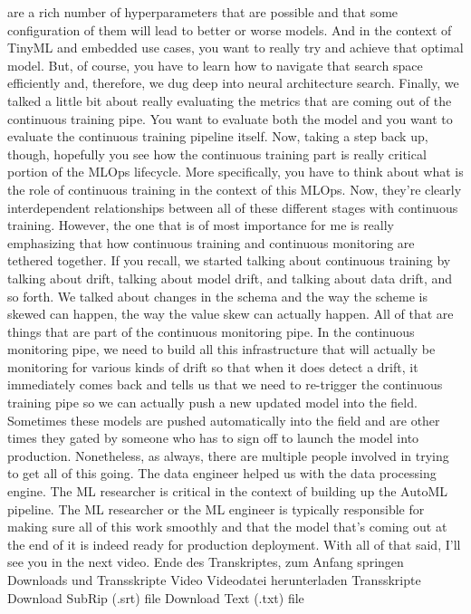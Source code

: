 {{{{    are a rich number of hyperparameters that are possible
    and that some configuration of them will lead to better or worse models.
    And in the context of TinyML and embedded use cases,
    you want to really try and achieve that optimal model.
    But, of course, you have to learn how to navigate
    that search space efficiently and, therefore, we dug deep
    into neural architecture search.
    Finally, we talked a little bit about really
    evaluating the metrics that are coming out of the continuous training pipe.
    You want to evaluate both the model and you
    want to evaluate the continuous training pipeline itself.
    Now, taking a step back up, though, hopefully you
    see how the continuous training part is really critical portion of the MLOps
    lifecycle.
    More specifically, you have to think about what
    is the role of continuous training in the context of this MLOps.
    Now, they're clearly interdependent relationships
    between all of these different stages with continuous training.
    However, the one that is of most importance for me
    is really emphasizing that how continuous training
    and continuous monitoring are tethered together.
    If you recall, we started talking about continuous training
    by talking about drift, talking about model drift,
    and talking about data drift, and so forth.
    We talked about changes in the schema and the way the scheme is skewed
    can happen, the way the value skew can actually happen.
    All of that are things that are part of the continuous monitoring pipe.
    In the continuous monitoring pipe, we need
    to build all this infrastructure that will actually
    be monitoring for various kinds of drift so that when it does detect a drift,
    it immediately comes back and tells us that we
    need to re-trigger the continuous training pipe so we can actually push
    a new updated model into the field.
    Sometimes these models are pushed automatically into the field
    and are other times they gated by someone
    who has to sign off to launch the model into production.
    Nonetheless, as always, there are multiple people involved
    in trying to get all of this going.
    The data engineer helped us with the data processing engine.
    The ML researcher is critical in the context
    of building up the AutoML pipeline.
    The ML researcher or the ML engineer is typically responsible
    for making sure all of this work smoothly
    and that the model that's coming out at the end of it
    is indeed ready for production deployment.
    With all of that said, I'll see you in the next video.
    Ende des Transkriptes, zum Anfang springen
    Downloads und Transskripte
    Video
    Videodatei herunterladen
    Transskripte
    Download SubRip (.srt) file
    Download Text (.txt) file  
 
}}}}
